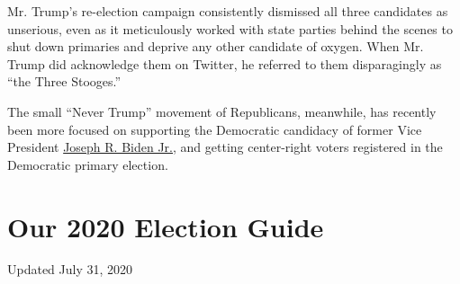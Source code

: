 Mr. Trump's re-election campaign consistently dismissed all three
candidates as unserious, even as it meticulously worked with state
parties behind the scenes to shut down primaries and deprive any other
candidate of oxygen. When Mr. Trump did acknowledge them on Twitter, he
referred to them disparagingly as ``the Three Stooges.''

The small ``Never Trump'' movement of Republicans, meanwhile, has
recently been more focused on supporting the Democratic candidacy of
former Vice President
\href{https://www.nytimes.com/interactive/2020/us/elections/joe-biden.html}{Joseph
R. Biden Jr.}, and getting center-right voters registered in the
Democratic primary election.

\hypertarget{our-2020-election-guide}{%
\section{Our 2020 Election Guide}\label{our-2020-election-guide}}

Updated July 31, 2020

